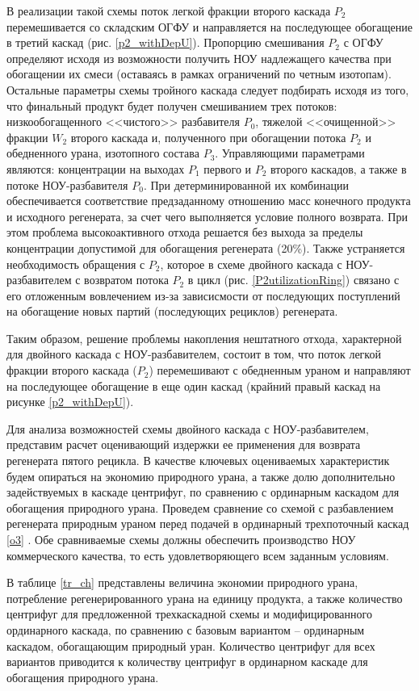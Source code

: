 В реализации такой схемы поток легкой фракции второго каскада $P_2$ перемешивается со складским ОГФУ и направляется на последующее обогащение в третий каскад (рис. \ref{p2_withDepU}). Пропорцию смешивания $P_2$ с ОГФУ определяют исходя из возможности получить НОУ надлежащего качества при обогащении их смеси (оставаясь в рамках ограничений по четным изотопам). Остальные параметры схемы тройного каскада следует подбирать исходя из того, что финальный продукт будет получен смешиванием трех потоков: низкообогащенного <<чистого>> разбавителя $P_0$, тяжелой <<очищенной>> фракции $W_2$ второго каскада и, полученного при обогащении потока $P_2$ и обедненного урана, изотопного состава $P_3$. Управляющими параметрами являются: концентрации на выходах $P_1$ первого и $P_2$ второго каскадов, а также в потоке НОУ-разбавителя $P_0$. При детерминированной их комбинации обеспечивается соответствие предзаданному отношению масс конечного продукта и исходного регенерата, за счет чего выполняется условие полного возврата. При этом проблема высокоактивного отхода решается без выхода за пределы концентрации допустимой для обогащения регенерата (20\%). Также устраняется необходимость обращения с $P_2$, которое в схеме двойного каскада с НОУ-разбавителем с возвратом потока $P_2$ в цикл (рис. \ref{P2utilizationRing}) связано с его отложенным вовлечением из-за зависисмости от последующих поступлений на обогащение новых партий (последующих рециклов) регенерата.

Таким образом, решение проблемы накопления нештатного отхода, характерной для двойного каскада с НОУ-разбавителем, состоит в том, что поток легкой фракции второго каскада ($P_2$) перемешивают с обедненным ураном и направляют на последующее обогащение в еще один каскад (крайний правый каскад на рисунке \ref{p2_withDepU}).

Для анализа возможностей схемы двойного каскада с НОУ-разбавителем, представим расчет оценивающий издержки ее применения для возврата регенерата пятого рецикла. 
В качестве ключевых оцениваемых характеристик будем опираться на экономию природного урана, а также долю дополнительно задействуемых в каскаде центрифуг, по сравнению с ординарным каскадом для обогащения природного урана. Проведем сравнение со схемой с разбавлением регенерата природным ураном перед подачей в ординарный трехпоточный каскад \ref{o3} \cite{smirnovMethodEnrichReprocessed2019}. Обе сравниваемые схемы должны обеспечить производство НОУ коммерческого качества, то есть удовлетворяющего всем заданным условиям.

В таблице \ref{tr_ch} представлены величина экономии природного урана, потребление регенерированного урана на единицу продукта, а также количество центрифуг для предложенной трехкаскадной схемы и модифицированного ординарного каскада, по сравнению с базовым вариантом -- ординарным  каскадом, обогащающим природный уран. Количество центрифуг для всех вариантов приводится к количеству центрифуг в ординарном каскаде для обогащения природного урана.

